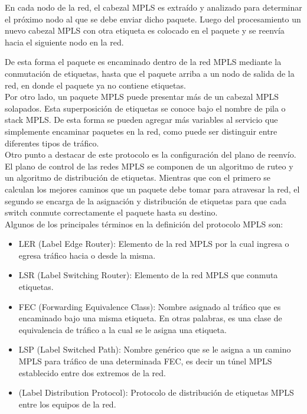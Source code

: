 En cada nodo de la red, el cabezal MPLS es extraído y analizado para determinar el próximo nodo al que se debe enviar dicho paquete. Luego del procesamiento un nuevo cabezal MPLS con otra etiqueta es colocado en el paquete y se reenvía hacia el siguiente nodo en la red.

De esta forma el paquete es encaminado dentro de la red MPLS mediante la conmutaci\'on de etiquetas, hasta que el paquete arriba a un nodo de salida de la red, en donde el paquete ya no contiene etiquetas.\\

Por otro lado, un paquete MPLS puede presentar más de un cabezal MPLS solapados. Esta superposición de etiquetas se conoce bajo el nombre de pila o stack MPLS. De esta forma se pueden agregar más variables al servicio que simplemente encaminar paquetes en la red, como puede ser distinguir entre diferentes tipos de tráfico.\\

Otro punto a destacar de este protocolo es la configuración del plano de reenvío. El plano de control de las redes MPLS se componen de un algoritmo de ruteo y un algoritmo de distribución de etiquetas. Mientras que con el primero se calculan los mejores caminos que un paquete debe tomar para atravesar la red, el segundo se encarga de la asignación y distribución de etiquetas para que cada switch conmute correctamente el paquete hasta su destino.\\

Algunos de los principales términos en la definici\'on del protocolo MPLS son:

\begin{itemize}
\item LER (Label Edge Router): Elemento de la red MPLS por la cual ingresa o egresa tráfico hacia o desde la misma.
\item LSR (Label Switching Router): Elemento de la red MPLS que conmuta etiquetas.
\item FEC (Forwarding Equivalence Class): Nombre asignado al tráfico que es encaminado bajo una misma etiqueta. En otras palabras, es una clase de equivalencia de tráfico a la cual se le asigna una etiqueta.
\item LSP (Label Switched Path): Nombre genérico que se le asigna a un camino MPLS para tráfico de una determinada FEC, es decir un túnel MPLS establecido entre dos extremos de la red.
\item {} (Label Distribution Protocol): Protocolo de distribución de etiquetas MPLS entre los equipos de la red.
 
\end{itemize}
\vspace{1cm}

